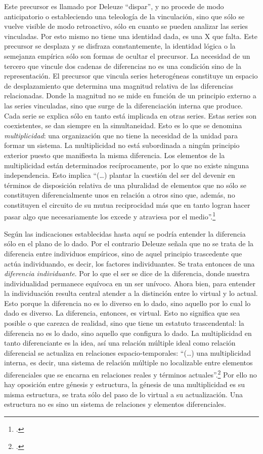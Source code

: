 Este precursor es llamado por Deleuze \enquote{dispar}, y no procede de modo anticipatorio o estableciendo una teleología de la vinculación, sino que sólo se vuelve visible de modo retroactivo, sólo en cuanto se pueden analizar las series vinculadas. Por esto mismo no tiene una identidad dada, es una X que falta. Este precursor se desplaza y se disfraza constantemente, la identidad lógica o la semejanza empírica sólo son formas de ocultar el precursor. La necesidad de un tercero que vincule dos cadenas de diferencias no es una condición sino de la representación. El precursor que vincula series heterogéneas constituye un espacio de desplazamiento que determina una magnitud relativa de las diferencias relacionadas. Donde la magnitud no se mide en función de un principio externo a las series vinculadas, sino que surge de la diferenciación interna que produce. Cada serie se explica sólo en tanto está implicada en otras series. Estas series son coexistentes, se dan siempre en la simultaneidad. Esto es lo que se denomina \emph{multiplicidad}: una organización que no tiene la necesidad de la unidad para formar un sistema. La multiplicidad no está subordinada a ningún principio exterior puesto que manifiesta la misma diferencia. Los elementos de la multiplicidad están determinados recíprocamente, por lo que no existe ninguna independencia. Esto implica \enquote{(\dots) plantar la cuestión del ser del devenir en términos de disposición relativa de una pluralidad de elementos que no sólo se constituyen diferencialmente unos en relación a otros sino que, además, no constituyen el circuito de su mutua reciprocidad más que en tanto logran hacer pasar algo que necesariamente los excede y atraviesa por el medio}.\footcite[15]{@6977-GALLEGO2008}

Según las indicaciones establecidas hasta aquí se podría entender la diferencia sólo en el plano de lo dado. Por el contrario Deleuze señala que no se trata de la diferencia entre individuos empíricos, sino de aquel principio trascedente que actúa individuando, es decir, los factores individuantes. Se trata entonces de una \emph{diferencia individuante}. Por lo que el ser se dice de la diferencia, donde nuestra individualidad permanece equívoca en un ser unívoco. Ahora bien, para entender la individuación resulta central atender a la distinción entre lo virtual y lo actual. Esto porque la diferencia no es lo diverso en lo dado, sino aquello por lo cual lo dado es diverso. La diferencia, entonces, es virtual. Esto no significa que sea posible o que carezca de realidad, sino que tiene un estatuto trascendental: la diferencia no es lo dado, sino aquello que configura lo dado. La multiplicidad en tanto diferenciante es la idea, así una relación múltiple ideal como relación diferencial se actualiza en relaciones espacio-temporales: \enquote{(\dots) una multiplicidad interna, es decir, una sistema de relación múltiple no localizable entre elementos diferenciales que se encarna en relaciones reales y términos actuales}.\footcite[278]{@6961-DELEUZE2002} Por ello no hay oposición entre génesis y estructura, la génesis de una multiplicidad es su misma estructura, se trata sólo del paso de lo virtual a su actualización. Una estructura no es sino un sistema de relaciones y elementos diferenciales.


